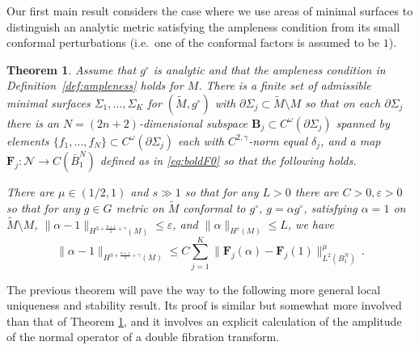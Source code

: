 \documentclass[11pt]{amsart}
\newtheorem{Theorem}{Theorem}[section]
\theoremstyle{definition}
\numberwithin{equation}{section}
\newcommand{\norm}[1]{\lVert #1 \rVert}         %
\newcommand{\eps}{\varepsilon}
\newcommand{\p}{\partial}
\begin{document}
    Our first main result considers the case where we use areas of minimal surfaces to distinguish an analytic metric satisfying the ampleness condition from its small conformal perturbations (i.e.\ one of the conformal factors is assumed to be $1$). %
\begin{Theorem}\label{thm:rigidity}
	Assume that $g^\circ$ is analytic and that the ampleness condition in Definition~\ref{def:ampleness} holds for $M$. There is a finite set of admissible minimal surfaces $\Sigma_1,\dots,\Sigma_K$ for $(\widetilde{M},g^\circ)$ with $\p\Sigma_j \subset \widetilde{M}\setminus M$ so that on each $\p\Sigma_j$ there is an $N=(2n+2)$-dimensional subspace $\mathbf{B}_j \subset C^\omega(\partial\Sigma_j)$ spanned by elements $\{f_1,\dots, f_{N}\} \subset C^\omega(\partial\Sigma_j)$ each with $C^{2,\gamma}$-norm equal $\delta_j$, and a map $\mathbf{F}_j: \mathcal N \to C(\bar B_1^{N})$ defined as in \eqref{eq:boldF0} so that the following holds.
	


	There are $\mu \in (1/2,1)$ and $s \gg 1$ so that for any $L>0$ there are $C>0, \eps >0$ so that for any $g \in G$ metric on $\widetilde{M}$ conformal to $g^\circ$, $g = \alpha g^\circ$, satisfying $\alpha=1$ on $\widetilde{M}\setminus M$, $\norm{\alpha-1}_{H^{3+\frac{n+1}{2}+\gamma}(M)} \leq \eps$, and $\norm{\alpha}_{H^s(M)} \leq L$, we have
	\begin{equation}\label{eq:alphabound}
		\norm{\alpha-1}_{H^{3+\frac{n+1}{2}+\gamma}(M)} \leq C\sum_{j=1}^K\norm{\mathbf{F}_j(\alpha)-\mathbf{F}_j(1)}_{L^2(B_1^{N})}^\mu\,.
	\end{equation}
\end{Theorem}

The previous theorem will pave the way to the following more general local uniqueness and stability result. Its proof is similar but somewhat more involved than that of Theorem \ref{thm:rigidity}, and it involves an explicit calculation of the amplitude of the normal operator of a double fibration transform.
\end{document}

